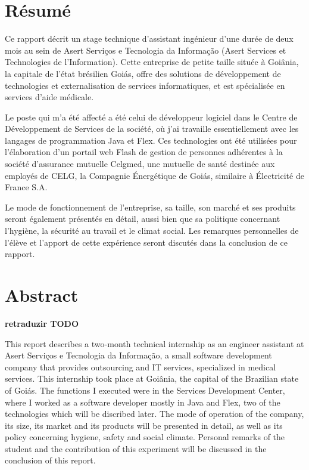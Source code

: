 \chapter*{Résumé}

Ce rapport décrit un stage technique d'assistant ingénieur d'une durée de deux mois au sein de Asert Serviços e Tecnologia da Informação (Asert Services et Technologies de l'Information). Cette entreprise de petite taille située à Goiânia, la capitale de l'état brésilien Goiás, offre des solutions de développement de technologies et externalisation de services informatiques, et est spécialisée en services d'aide médicale. 

Le poste qui m'a été affecté a été celui de développeur logiciel dans le Centre de Développement de Services de la société, où j'ai travaille essentiellement avec les langages de programmation Java et Flex. Ces technologies ont été utilisées pour l'élaboration d'un portail web Flash de gestion de personnes adhérentes à la société d'assurance mutuelle Celgmed, une mutuelle de santé destinée aux employés de CELG, la Compagnie Énergétique de Goiás, similaire à Électricité de France S.A.

Le mode de fonctionnement de l'entreprise, sa taille, son marché et ses produits seront également présentés en détail, aussi bien que sa politique concernant l'hygiène, la sécurité au travail et le climat social. Les remarques personnelles de l'élève et l'apport de cette expérience seront discutés dans la conclusion de ce rapport.


\chapter*{Abstract}

\begin{center}
\bfseries retraduzir TODO
\end{center}

This report describes a two-month technical internship as an engineer assistant at Asert Serviços e Tecnologia da Informação, a small software development company that provides outsourcing and IT services, specialized in medical services. This internship took place at Goiânia, the capital of the Brazilian state of Goiás. The functions I executed were in the Services Development Center, where I worked as a software developer mostly in Java and Flex, two of the technologies which will be discribed later. The mode of operation of the company, its size, its market and its products will be presented in
detail, as well as its policy concerning hygiene, safety and social climate. Personal remarks of the student and the contribution of this experiment will be discussed in the conclusion of this report.

